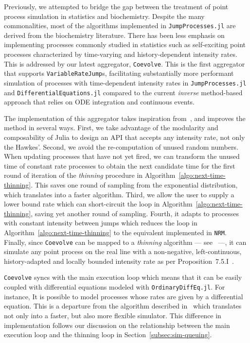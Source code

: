 \documentclass{juliacon}
\numberwithin{equation}{section}
\begin{document}
Previously, we attempted to bridge the gap between the treatment of point process simulation in statistics and biochemistry. Despite the many commonalities, most of the algorithms implemented in \texttt{JumpProcesses.jl} are derived from the biochemistry literature. There has been less emphasis on implementing processes commonly studied in statistics such as self-exciting point processes characterized by time-varying and history-dependent intensity rates. This is addressed by our latest aggregator, \texttt{Coevolve}. This is the first aggregator that supports \texttt{VariableRateJump}s, facilitating substantially more performant simulation of processes with time-dependent intensity rates in \texttt{JumpProcesses.jl} and \texttt{DifferentialEquations.jl} compared to the current \textit{inverse} method-based approach that relies on ODE integration and continuous events.

The implementation of this aggregator takes  inspiration from~\cite{farajtabar2017}, and improves the method in several ways. First, we take advantage of the modularity and composability of Julia to design an API that accepts any intensity rate, not only the Hawkes'. Second, we avoid the re-computation of unused random numbers. When updating processes that have not yet fired, we can transform the unused time of constant rate processes to obtain the next candidate time for the first round of iteration of the \textit{thinning} procedure in Algorithm~\ref{algo:next-time-thinning}. This saves one round of sampling from the exponential distribution, which translates into a faster algorithm. Third, we allow the user to supply a lower bound rate which can short-circuit the loop in Algorithm~\ref{algo:next-time-thinning}, saving yet another round of sampling. Fourth, it adapts to processes with constant intensity between jumps which reduces the loop in Algorithm~\ref{algo:next-time-thinning} to the equivalent implemented in \texttt{NRM}. Finally, since \texttt{Coevolve} can be mapped to a \textit{thinning} algorithm --- see~\cite{farajtabar2017} ---, it can simulate any point process on the real line with a non-negative, left-continuous, history-adapted and locally bounded intensity rate as per Proposition~7.5.I~\cite{daley2003}.

\texttt{Coevolve} syncs with the main execution loop which means that it can be easily coupled with differential equations modeled with \texttt{OrdinaryDiffEq.jl}. For instance, It is possible to model processes whose rates are given by a differential equation. This is a departure from the algorithm described in~\cite{farajtabar2017} which translates not only into a faster, but also more flexible simulator. This difference in implementation follows our discussion on the relationship between the main execution loop and the thinning loop in Section~\ref{subsec:sim-queuing}.
\end{document}
